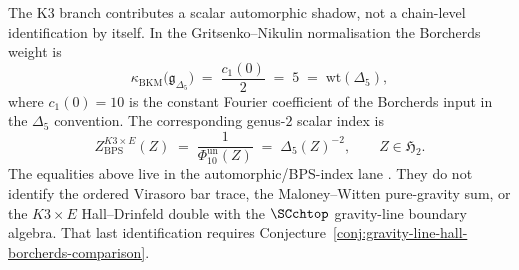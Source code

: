 \begin{remark}
\label{rem:3dqg-phi-trace-identity}%
%
%
%
%
The K3 branch contributes a scalar automorphic shadow, not a
chain-level identification by itself. In the Gritsenko--Nikulin
normalisation the Borcherds weight is
\begin{equation}\label{eq:phi-trace-identity-3dqg}
\kappa_{\mathrm{BKM}}\bigl(\mathfrak{g}_{\Delta_5}\bigr)
\;=\;
\frac{c_1(0)}{2}
\;=\;5
\;=\;\mathrm{wt}(\Delta_5),
\end{equation}
where $c_1(0)=10$ is the constant Fourier coefficient of the
Borcherds input in the $\Delta_5$ convention. The corresponding
genus-$2$ scalar index is
\[
Z_{\mathrm{BPS}}^{K3\times E}(Z)
\;=\;
\frac{1}{\Phi_{10}^{\mathrm{un}}(Z)}
\;=\;
\Delta_5(Z)^{-2},
\qquad Z\in\mathfrak H_2.
\]
The equalities above live in the automorphic/BPS-index lane
\cite{GritsenkoNikulin1998,Borcherds1998,
DijkgraafMooreVerlindeVerlinde1997}. They do not identify the
ordered Virasoro bar trace, the Maloney--Witten pure-gravity sum, or
the $K3\times E$ Hall--Drinfeld double with the
$\SCchtop$ gravity-line boundary algebra. That last identification
requires Conjecture~\ref{conj:gravity-line-hall-borcherds-comparison}.
\end{remark}

